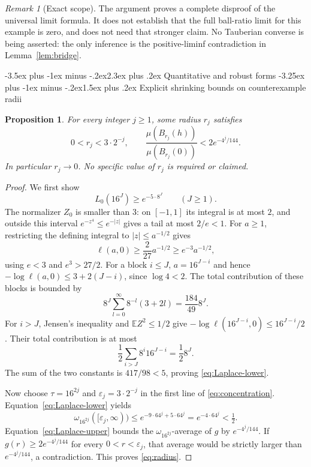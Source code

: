 \documentclass[11pt]{article}
\makeatletter
\renewcommand{\section}{\@startsection{section}{1}{0pt}
  {-3.5ex plus -1ex minus -.2ex}{2.3ex plus .2ex}
  {\normalfont\large\bfseries\color{MidnightBlue}}}
\renewcommand{\subsection}{\@startsection{subsection}{2}{0pt}
  {-3.25ex plus -1ex minus -.2ex}{1.5ex plus .2ex}
  {\normalfont\normalsize\bfseries}}
\newtheorem{proposition}[theorem]{Proposition}
\theoremstyle{remark}
\newtheorem{remark}[theorem]{Remark}
\newcommand{\E}{\mathbb E}
\makeatother
\begin{document}
\begin{remark}[Exact scope]
The argument proves a complete disproof of the universal limit formula. It does not establish that the full ball-ratio limit for this example is zero, and does not need that stronger claim. No Tauberian converse is being asserted: the only inference is the positive-liminf contradiction in Lemma~\ref{lem:bridge}.
\end{remark}

\section{Quantitative and robust forms}
\subsection{Explicit shrinking bounds on counterexample radii}
\begin{proposition}\label{prop:radius}
For every integer $j\ge1$, some radius $r_j$ satisfies
\begin{equation}\label{eq:radius}
0<r_j<3\cdot2^{-j},\qquad
\frac{\mu(B_{r_j}(h))}{\mu(B_{r_j}(0))}<2e^{-4^j/144}.
\end{equation}
In particular $r_j\to0$. No specific value of $r_j$ is required or claimed.
\end{proposition}
\begin{proof}
We first show
\begin{equation}\label{eq:Laplace-lower}
L_0(16^J)\ge e^{-5\cdot8^J}\qquad(J\ge1).
\end{equation}
The normalizer $Z_0$ is smaller than $3$: on $[-1,1]$ its integral is at most $2$, and outside this interval $e^{-z^4}\le e^{-|z|}$ gives a tail at most $2/e<1$.
For $a\ge1$, restricting the defining integral to $|z|\le a^{-1/2}$ gives
\[
\ell(a,0)\ge\frac{2}{27}a^{-1/2}\ge e^{-3}a^{-1/2},
\]
using $e<3$ and $e^3>27/2$.
For a block $i\le J$, $a=16^{J-i}$ and hence
$-\log\ell(a,0)\le3+2(J-i)$, since $\log4<2$.
The total contribution of these blocks is bounded by
\[
8^J\sum_{l=0}^\infty8^{-l}(3+2l)=\frac{184}{49}8^J.
\]
For $i>J$, Jensen's inequality and $\E Z^2\le1/2$ give
$-\log\ell(16^{J-i},0)\le16^{J-i}/2$.
Their total contribution is at most
\[
\frac12\sum_{i>J}8^i16^{J-i}=\frac12 8^J.
\]
The sum of the two constants is $417/98<5$, proving \eqref{eq:Laplace-lower}.

Now choose $\tau=16^{2j}$ and $\varepsilon_j=3\cdot2^{-j}$ in the first line of \eqref{eq:concentration}. Equation~\eqref{eq:Laplace-lower} yields
\[
\omega_{16^{2j}}([\varepsilon_j,\infty))
\le e^{-9\cdot64^j+5\cdot64^j}=e^{-4\cdot64^j}<\tfrac12.
\]
Equation~\eqref{eq:Laplace-upper} bounds the $\omega_{16^{2j}}$-average of $g$ by $e^{-4^j/144}$. If $g(r)\ge2e^{-4^j/144}$ for every $0<r<\varepsilon_j$, that average would be strictly larger than $e^{-4^j/144}$, a contradiction. This proves \eqref{eq:radius}.
\end{proof}
\end{document}
